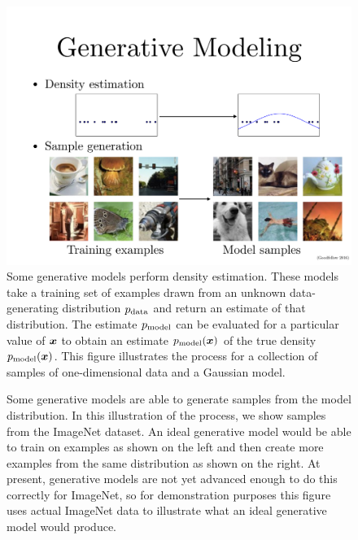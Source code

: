 \begin{figure}
\center
\includegraphics[width=\textwidth]{density.pdf}
\caption{Some generative models perform density estimation.
These models take a training set of examples drawn from an unknown
data-generating distribution $p_{\rm{data}}$ and return an estimate of that
distribution. The estimate $p_{\rm{model}}$ can be evaluated for a particular
value of ${\bm{x}}$ to obtain an estimate $p_{\rm{model}}({\bm{x}})$ of the true
density $p_{\rm{model}}({\bm{x}})$.
This figure illustrates the process for a collection of samples of
one-dimensional data and a Gaussian model.
}
\label{fig:density}
\end{figure}

\begin{figure}
  \center
  \caption{Some generative models are able to generate samples
    from the model distribution.
    In this illustration of the process, we show samples from
    the ImageNet \citep{imagenet_cvpr09,Deng2010,ILSVRCarxiv14} 
    dataset.
    An ideal generative model would be able to train on examples
    as shown on the left and then create more examples from the
    same distribution as shown on the right.
    At present, generative models are not yet advanced enough to
    do this correctly for ImageNet, so for demonstration purposes
    this figure uses actual ImageNet data to illustrate what an
    ideal generative model would produce.
  }
  \label{fig:generative_machine}
\end{figure}

